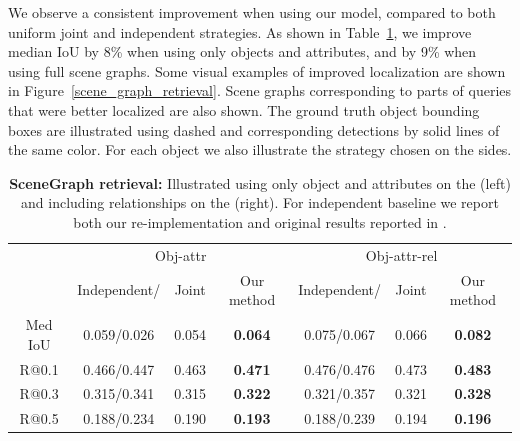 \documentclass[runningheads]{llncs}
\begin{document}
We observe a consistent improvement when using our model, compared to both uniform joint and independent strategies. As shown in Table~\ref{tab:inference}, we improve median IoU by 8\% when using only objects and attributes, and by 9\% when using full scene graphs. Some visual examples of improved localization are shown in Figure~\ref{scene_graph_retrieval}. Scene graphs corresponding to parts of queries that were better localized are also shown. The ground truth object bounding boxes are illustrated using dashed and corresponding detections by solid lines of the same color. For each object we also illustrate the strategy chosen on the sides.
\begin{table}[t]
\begin{center}
 \begin{tabular}{|c || c | c | c|| c | c | c |} 
 \hline
 & \multicolumn{3}{|c||}{Obj-attr} &
 \multicolumn{3}{c|}{Obj-attr-rel} \\
 \cline{2-7}
  & Independent/\cite{Johnson2015} & Joint & Our method & Independent/\cite{Johnson2015} & Joint & Our method\\ [0.5ex] 
 \hline\hline
 Med IoU & 0.059/0.026 & 0.054 & \textbf{0.064}  &  0.075/0.067 & 0.066 & \textbf{0.082}\\ 
 \hline
 R@0.1 &  0.466/0.447 & 0.463 & \textbf{0.471}  &  0.476/0.476 & 0.473 & \textbf{0.483}\\ 
 R@0.3 &  0.315/0.341 & 0.315 & \textbf{0.322}  &  0.321/0.357 & 0.321 & \textbf{0.328}\\ 
 R@0.5 &  0.188/0.234 & 0.190 & \textbf{0.193}  &  0.188/0.239 & 0.194 & \textbf{0.196}\\
 \hline
\end{tabular}
\end{center}
\caption{{\bf SceneGraph retrieval:} Illustrated using only object and attributes on the (left) and including relationships on the (right). For independent baseline we report both our re-implementation and original results reported in \cite{Johnson2015}.}
\label{tab:inference}
\vspace*{-\baselineskip}
\vspace{-0.1in}
\end{table}










\end{document}
